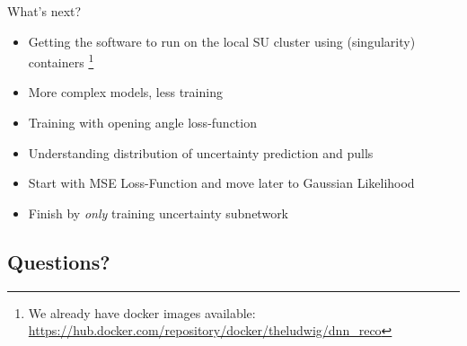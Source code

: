 \begin{frame}{What's next?}
    \begin{itemize}
        \item Getting the software to run on the local SU cluster using (singularity) containers
              \footnote{We already have docker images available: \tiny\url{https://hub.docker.com/repository/docker/theludwig/dnn_reco}}
        \item More complex models, less training
        \item Training with opening angle loss-function
        \item Understanding distribution of uncertainty prediction and pulls
        \item Start with MSE Loss-Function and move later to Gaussian Likelihood
        \item Finish by \emph{only} training uncertainty subnetwork
    \end{itemize}
\end{frame}
\begin{frame}

    \section*{Questions?}

\end{frame}